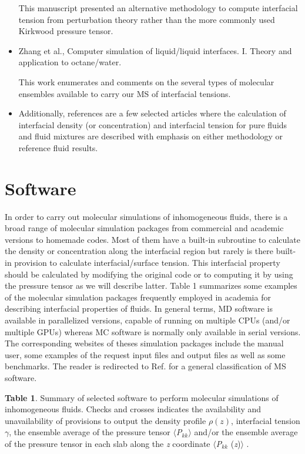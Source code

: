 \documentclass{scrbook}
\begin{document}
\begin{itemize}
  This manuscript presented an alternative methodology to compute interfacial tension from perturbation theory rather than the more commonly used Kirkwood pressure tensor.

\item Zhang et al., Computer simulation of liquid/liquid interfaces. I. Theory and application to octane/water. \citep{zhang1995}

  This work enumerates and comments on the several types of molecular ensembles available to carry our MS of interfacial tensions.

\item Additionally, references \citep{walton1983,chapela1977,trokhymchuk1999,mecke1997,mecke1999,duque2004,errington2007,stephan2019} are a few
  selected articles where the calculation of interfacial density (or
  concentration) and interfacial tension for pure fluids and fluid mixtures are
  described with emphasis on either methodology or reference fluid results. 

\end{itemize}

\section{Software}

In order to carry out molecular simulations of inhomogeneous fluids, there is
a broad range of molecular simulation packages from commercial and academic
versions to homemade codes. Most of them have a built-in subroutine to
calculate the density or concentration along the interfacial region but rarely
is there built-in provision to calculate interfacial/surface tension. This
interfacial property should be calculated by modifying the original code or to
computing it by using the pressure tensor as we will describe latter. Table
1 summarizes some examples of the molecular simulation packages frequently
employed in academia for describing interfacial properties of fluids. In
general terms, MD software is available in parallelized versions, capable of
running on multiple CPUs (and/or multiple GPUs) whereas MC software is normally
only available in serial versions. The corresponding websites of theses
simulation packages include the manual user, some examples of the request input
files and output files as well as some benchmarks. The reader is redirected to
Ref. \citep{wiki} for a general classification of MS software. 

\textbf{Table 1}. Summary of selected software to perform molecular simulations
of inhomogeneous fluids. Checks and crosses indicates the availability and
unavailability of provisions to output the density profile ${\rho}(z)$,
interfacial tension $\gamma$, the ensemble average of the pressure tensor
${\langle}$\textit{P}$_{kk}$${\rangle}$ and/or the ensemble average of the
pressure tensor in each slab along the \textit{z} coordinate
${\langle}$\textit{P}$_{kk}$ (\textit{z})${\rangle}$ . 
\end{document}
